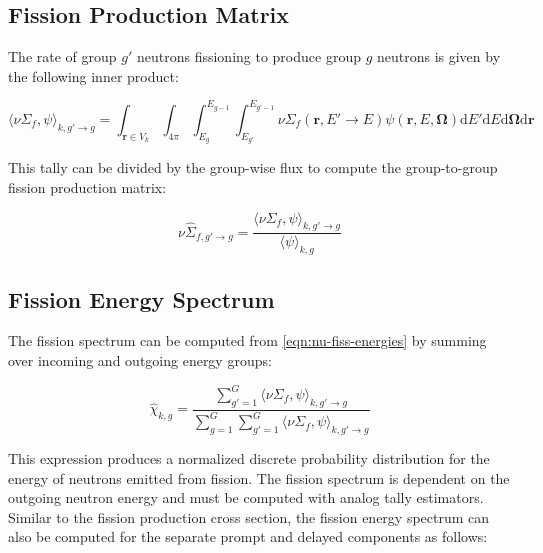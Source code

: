 \subsection{Fission Production Matrix}
\label{subsubsec:tally-types-fiss-matrix}

The rate of group $g'$ neutrons fissioning to produce group $g$ neutrons is given by the following inner product:

\begin{equation}
\label{eqn:nu-fiss-energies}
\langle \nu\Sigma_{f}, \psi \rangle_{k,g'\rightarrow g} = \int_{\mathbf{r} \in V_{k}} \int_{4\pi} \int_{E_{g}}^{E_{g-1}} \int_{E_{g'}}^{E_{g'-1}} \nu\Sigma_{f}(\mathbf{r},E'\rightarrow E)\psi(\mathbf{r},E,\mathbf{\Omega}) \mathrm{d}E'\mathrm{d}E\mathrm{d}\mathbf{\Omega}\mathrm{d}\mathbf{r}
\end{equation}

\noindent This tally can be divided by the group-wise flux to compute the group-to-group fission production matrix:

\begin{equation}
\label{eqn:fiss-prod-mat}
\nu\hat{\Sigma}_{f,g'\rightarrow g} = \frac{\langle \nu\Sigma_{f}, \psi \rangle_{k,g'\rightarrow g}}{\langle \psi \rangle_{k,g}}
\end{equation}


\subsection{Fission Energy Spectrum}
\label{subsubsec:tally-types-chi}

The fission spectrum can be computed from \cref{eqn:nu-fiss-energies} by summing over incoming and outgoing energy groups:

\begin{equation}
\label{eqn:chi}
\hat{\chi}_{k,g} = \frac{\displaystyle\sum\limits_{g'=1}^{G} \langle \nu\Sigma_{f}, \psi \rangle_{k,g'\rightarrow g}}{\displaystyle\sum\limits_{g=1}^{G} \displaystyle\sum\limits_{g'=1}^{G} \langle \nu\Sigma_{f}, \psi \rangle_{k,g'\rightarrow g}}
\end{equation}

\noindent This expression produces a normalized discrete probability distribution for the energy of neutrons emitted from fission. The fission spectrum is dependent on the outgoing neutron energy and must be computed with analog tally estimators. Similar to the fission production cross section, the fission energy spectrum can also be computed for the separate prompt and delayed components as follows:

